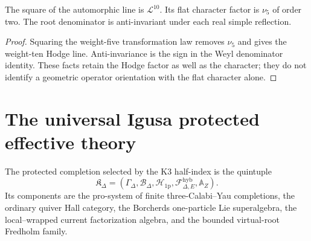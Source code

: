 \begin{corollary}
The square of the automorphic line is $\mathcal L^{10}$.
Its flat character factor is $\nu_5$ of order two.
The root denominator is anti-invariant under each real
simple reflection.
\end{corollary}
\begin{proof}
Squaring the weight-five transformation law removes
$\nu_5$ and gives the weight-ten Hodge line.
Anti-invariance is the sign in the Weyl denominator
identity. These facts retain the Hodge factor as well
as the character; they do not identify a geometric
operator orientation with the flat character alone.
\end{proof}

\chapter{The universal Igusa protected effective theory}
\begin{definition}
The protected completion selected by the K3 half-index is the quintuple
\[
 \mathfrak K_{\Delta}=
 \left(
 \Gamma_\Delta,
 \mathcal B_\Delta,
 \mathcal H_{\mathrm{1p}},
 \mathcal F^{\mathrm{hyb}}_{\Delta,E},
 \mathbb A_Z
 \right).
\]
Its components are the pro-system of finite three-Calabi--Yau completions, the ordinary quiver Hall category, the Borcherds one-particle Lie superalgebra, the local--wrapped current factorization algebra, and the bounded virtual-root Fredholm family.
\end{definition}

